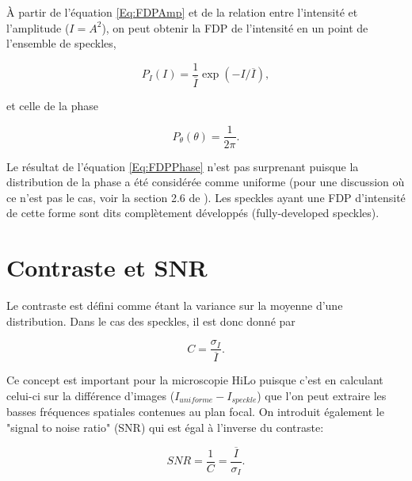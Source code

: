 \documentclass{article}       %
\begin{document}
À partir de l'équation \ref{Eq:FDPAmp} et de la relation entre l'intensité et l'amplitude ($I=A^2$), on peut obtenir la FDP de l'intensité en un point de l'ensemble de speckles,

\begin{equation}
\label{Eq:FDPInt}
    P_{I}(I) = \frac{1}{\overline{I}}\exp(-I/\overline{I}),
\end{equation}

et celle de la phase

\begin{equation}
\label{Eq:FDPPhase}
    P_{\theta}(\theta) = \frac{1}{2\pi}.
\end{equation}

Le résultat de l'équation \ref{Eq:FDPPhase} n'est pas surprenant puisque la distribution de la phase a été considérée comme uniforme (pour une discussion où ce n'est pas le cas, voir la section 2.6 de \cite{Manuel}). Les speckles ayant une FDP d'intensité de cette forme sont dits complètement développés (fully-developed speckles).\\

\bigskip


\section{Contraste et SNR}

Le contraste est défini comme étant la variance sur la moyenne d'une distribution. Dans le cas des speckles, il est donc donné par

\begin{equation*}
    C = \frac{\sigma_I}{\overline{I}}.
\end{equation*}

Ce concept est important pour la microscopie HiLo puisque c'est en calculant celui-ci sur la différence d'images ($I_{uniforme}-I_{speckle}$) que l'on peut extraire les basses fréquences spatiales contenues au plan focal. On introduit également le "signal to noise ratio" (SNR) qui est égal à l'inverse du contraste:

\begin{equation*}
    SNR = \frac{1}{C} = \frac{\overline{I}}{\sigma_I}.
\end{equation*}
\end{document}
